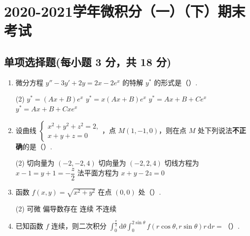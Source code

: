 \documentclass[../main.tex]{subfiles}
\begin{document}
\chapter{2020-2021学年微积分（一）（下）期末考试}

\section{单项选择题(每小题 3 分，共 18 分)}
\begin{enumerate}
    \item 微分方程 \( y'' - 3y' + 2y = 2x - 2e^x \) 的特解 \( y^* \) 的形式是（\qquad）.

          \begin{tasks}[label=\textbf{\Alph*.}, label-width=1.5em, column-sep=1em](2)
              \task \( y^* = (Ax + B)e^x \)
              \task \( y^* = x(Ax + B)e^x \)
              \task \( y^* = Ax + B + Ce^x \)
              \task \( y^* = Ax + B + Cxe^x \)
          \end{tasks}

    \item 设曲线 \( \begin{cases} x^2 + y^2 + z^2 = 2, \\ x + y + z = 0 \end{cases} \)，点 \( M(1, -1, 0) \)，则在点 \( M \) 处下列说法\textbf{不正确}的是（\qquad）.

          \begin{tasks}[label=\textbf{\Alph*.}, label-width=1.5em, column-sep=1em](2)
              \task 切向量为 \((-2, -2, 4)\)
              \task 切向量为 \((-2, 2, 4)\)
              \task 切线方程为 \( x - 1 = y + 1 = -\dfrac{z}{2} \)
              \task 法平面方程为 \( x + y - 2z = 0 \)
          \end{tasks}

    \item 函数 \( f(x, y) = \sqrt{x^2 + y^2} \) 在点 \( (0, 0) \) 处（\qquad）.

          \begin{tasks}[label=\textbf{\Alph*.}, label-width=1.5em, column-sep=1em](2)
              \task 可微
              \task 偏导数存在
              \task 连续
              \task 不连续
          \end{tasks}

    \item 已知函数 \( f \) 连续，则二次积分 \( \displaystyle \int_0^{\frac{\pi}{2}} \mathrm{d}\theta \displaystyle \int_0^{2\sin\theta} f(r\cos\theta, r\sin\theta) r\,\mathrm{d}r = \)（\qquad）.


\end{enumerate}
\end{document}
